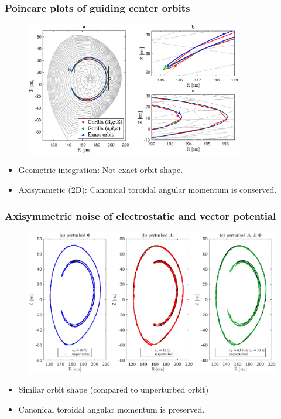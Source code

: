 \documentclass{beamer}
\begin{document}
\begin{frame}
\frametitle{Poincare plots of guiding center orbits}
\vspace{-1.1cm}
\begin{figure}
	\hspace*{-0.9cm}\includegraphics[trim={0cm 0cm 0cm 0cm},clip,width=0.85\textwidth]{FIGURES/orbit_plot.eps}
\end{figure}
\begin{itemize}
	\vspace*{-0.5cm}
\item Geometric integration: Not exact orbit shape.
\item Axisymmetic (2D): Canonical toroidal angular momentum is conserved.
\end{itemize}
\end{frame}

\begin{frame}
\frametitle{Axisymmetric noise of electrostatic and vector potential}
\vspace{-0.4cm}
\begin{figure}
	\hspace*{-1.05cm}\includegraphics[trim={0cm 0cm 0cm 0cm},clip,width=1\textwidth]{FIGURES/axissymetric_noise.eps}
\end{figure}
\begin{itemize}
	\vspace*{-0.6cm}
	\item Similar orbit shape (compared to unperturbed orbit)
	\item Canonical toroidal angular momentum is preserved.
\end{itemize}
\end{frame}
\end{document}
